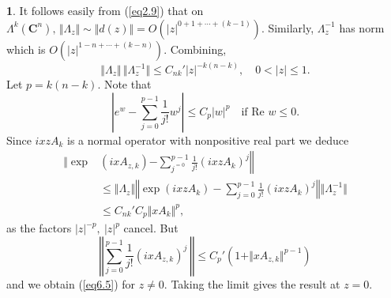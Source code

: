 \documentclass{surv-l}
\theoremstyle{plain}
\theoremstyle{definition}
\newtheorem*{pf}{\sc{Proof}}
\numberwithin{equation}{chapter}
\begin{document}
\begin{pf}
It follows easily from (\ref{eq2.9}) that on $\Lambda^{k}(\mathbf{C}^{n}),\, \Vert\Lambda_{z}\Vert\sim\Vert d(z)\Vert= O(|z|^{0+1+\cdots +(k-1)})$. Similarly, $\Lambda_{z}^{-1}$ has norm which is $O(|z|^{1-n+\cdots +(k-n)})$. Combining,
\begin{equation}\label{eq6.6}
\Vert\Lambda_{z}\Vert\,\Vert\Lambda_{z}^{-1}\Vert\leq C_{nk}'|z|^{-k(n-k)},\quad 0<|z|\leq 1.
\end{equation}
Let $p=k(n -k)$. Note that
\begin{equation*}
\left|e^{w}-\sum_{j=0}^{p-1}\frac{1}{j!}w^{j}\right|\leq C_{p}|w|^{p}\quad \text{if Re } w\leq 0.
\end{equation*}
Since $ixzA_{k}$ is a normal operator with nonpositive real part we deduce
\begin{align*}
\Bigg\Vert \exp &(ixA_{z,k})\left. -\sum_{j^{=0}}^{p-1}\frac{1}{j!}(ixzA_{k})^{j}\right\Vert\\
&\leq\Vert\Lambda_{z}\Vert\left\Vert\exp(ixzA_{k})-\sum_{j=0}^{p-1}\frac{1}{j!}(ixzA_{k})^{j}\right\Vert\Vert\Lambda_{z}^{-1}\Vert\\
&\leq C_{nk}'C_{p}\Vert xA_{k}\Vert^{p},
\end{align*}
as the factors $|z|^{-p},\ |z|^{p}$ cancel. But
\begin{equation*}
\left\Vert\sum_{j=0}^{p-1}\frac{1}{j!}(ixA_{z,k})^{j}\ \right\Vert\leq C_{p}'(1+\Vert xA_{z,k}\Vert^{p-1})
\end{equation*}
and we obtain (\ref{eq6.5}) for $z\neq 0$. Taking the limit gives the result at $z=0$.
\end{pf}
\setcounter{theorem}{6}
\end{document}
